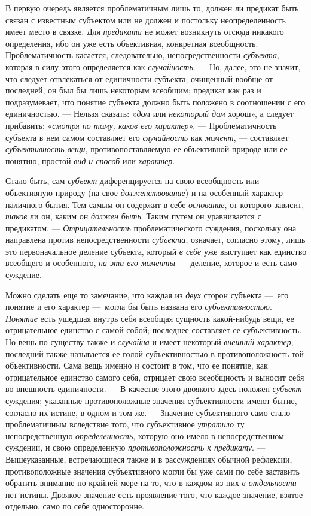 \documentclass[twoside]{article}
\begin{document}
{{{\label{bkm:bm66a}В первую очередь является проблематичным лишь
то, должен ли предикат быть связан с известным субъектом или не должен и
постольку неопределенность имеет место в связке. Для
{\em предиката} не может
возникнуть отсюда никакого определения, ибо он уже есть объективная,
конкретная всеобщность. Проблематичность касается, следовательно,
непосредственности {\em субъекта},
которая в силу этого определяется как
{\em случайность}. — Но,
далее, это не значит, что следует отвлекаться от единичности субъекта;
очищенный вообще от последней, он был бы лишь некоторым всеобщим; предикат
как раз и подразумевает, что понятие субъекта должно быть положено в
соотношении с его единичностью. — Нельзя сказать:
«{\em дом} или
{\em некоторый дом}
хорош», а следует прибавить:
«{\em смотря по тому, каков его
характер}». — Проблематичность субъекта в нем самом
составляет его {\em случайность}
как {\em момент}, —
составляет
{\em субъективность вещи},
противопоставляемую ее объективной природе или ее понятию,
простой {\em вид и способ}
или {\em характер}.

Стало быть, сам
{\em субъект}
диференцируется на свою всеобщность или объективную природу
(на свое {\em долженствование})
и на особенный характер наличного бытия. Тем самым он
содержит в себе {\em основание},
от которого зависит,
{\em таков} ли он, каким
он {\em должен быть}.
Таким путем он уравнивается с предикатом. —
{\em Отрицательность}
проблематического суждения, поскольку она направлена против
непосредственности {\em субъекта},
означает, согласно этому, лишь это первоначальное деление
субъекта, который {\em в себе}
уже выступает как единство всеобщего и особенного,
{\em на эти его моменты}
—~деление, которое и есть само суждение.

Можно сделать еще то замечание, что каждая из
{\em двух} сторон
субъекта —~его понятие и его характер —~могла
бы быть названа его
{\em субъективностью}.
\label{bkm:bm01a}{\em Понятие}
есть ушедшая внутрь себя всеобщая сущность какой-нибудь вещи,
ее отрицательное единство с самой собой; последнее составляет ее
субъективность. Но вещь по существу также и
{\em случайна} и имеет
некоторый {\em внешний характер};
последний также называется ее голой субъективностью в
противоположность той объективности. Сама вещь именно и состоит в том, что
ее понятие, как отрицательное единство самого себя, отрицает свою
всеобщность и выносит себя во внешность единичности. — В
качестве этого двоякого здесь положен
{\em субъект} суждения;
указанные противоположные значения субъективности имеют бытие, согласно их
истине, в одном и том же. — Значение субъективного само
стало проблематичным вследствие того, что субъективное
{\em утратило} ту
непосредственную {\em определенность},
которую оно имело в непосредственном суждении, и свою
определенную {\em противоположность к
предикату}. — Вышеуказанные, встречающиеся также и в
рассуждениях обычной рефлексии, противоположные значения субъективного
могли бы уже сами по себе заставить обратить внимание по крайней мере на
то, что в каждом из них {\em в
отдельности} нет истины. Двоякое значение есть проявление
того, что каждое значение, взятое отдельно, само по себе односторонне.

}}}
\end{document}
